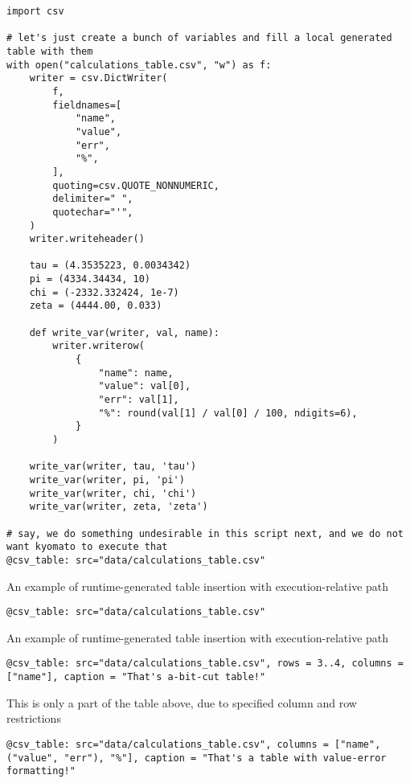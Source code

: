 \documentclass[a4paper]{article}
\begin{document}
\begin{verbatim}
import csv

# let's just create a bunch of variables and fill a local generated table with them
with open("calculations_table.csv", "w") as f:
    writer = csv.DictWriter(
        f,
        fieldnames=[
            "name",
            "value",
            "err",
            "%",
        ],
        quoting=csv.QUOTE_NONNUMERIC,
        delimiter=" ",
        quotechar="'",
    )
    writer.writeheader()

    tau = (4.3535223, 0.0034342)
    pi = (4334.34434, 10)
    chi = (-2332.332424, 1e-7)
    zeta = (4444.00, 0.033)

    def write_var(writer, val, name):
        writer.writerow(
            {
                "name": name,
                "value": val[0],
                "err": val[1],
                "%": round(val[1] / val[0] / 100, ndigits=6),
            }
        )

    write_var(writer, tau, 'tau')
    write_var(writer, pi, 'pi')
    write_var(writer, chi, 'chi')
    write_var(writer, zeta, 'zeta')

# say, we do something undesirable in this script next, and we do not want kyomato to execute that
@csv_table: src="data/calculations_table.csv"
\end{verbatim}

An example of runtime-generated table insertion with execution-relative path \\

\begin{verbatim}
@csv_table: src="data/calculations_table.csv"
\end{verbatim}

An example of runtime-generated table insertion with execution-relative path \\

\begin{verbatim}
@csv_table: src="data/calculations_table.csv", rows = 3..4, columns = ["name"], caption = "That's a-bit-cut table!"
\end{verbatim}

This is only a part of the table above, due to specified column and row restrictions \\

\begin{verbatim}
@csv_table: src="data/calculations_table.csv", columns = ["name", ("value", "err"), "%"], caption = "That's a table with value-error formatting!"
\end{verbatim}
\end{document}
